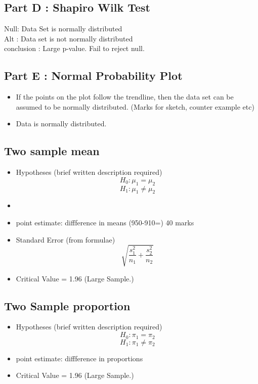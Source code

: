 \documentclass[]{article}
\begin{document}
\subsection*{Part D : Shapiro Wilk Test}
Null: Data Set is normally distributed\\
Alt : Data set is not normally distributed\\
conclusion : Large p-value. Fail to reject null.
\subsection*{Part E : Normal Probability Plot}
\begin{itemize}
\item If the points on the plot follow the trendline, then the data set can be assumed to be normally distributed. (Marks for sketch, counter example etc)
\item Data is normally distributed.
\end{itemize}

\subsection*{Two sample mean}
\begin{itemize}
\item Hypotheses (brief written description required)
\[ H_0 :  \mu_1 = \mu_2\]
\[ H_1 :  \mu_1 \neq \mu_2\]
\item 
\item point estimate:  diffference in means (950-910=) 40 marks
\item Standard Error (from formulae)
\[\sqrt{\frac{s^2_1}{n_1} + \frac{s^2_2}{n_2} }\]
\item Critical Value = 1.96 (Large Sample.)
\end{itemize}

\subsection*{Two Sample proportion}
\begin{itemize}
\item Hypotheses (brief written description required)
\[ H_0 :  \pi_1 = \pi_2\]
\[ H_1 :  \pi_1 \neq \pi_2\]
\item point estimate:  diffference in proportions
\item Critical Value = 1.96 (Large Sample.)
\end{itemize}
\end{document}
